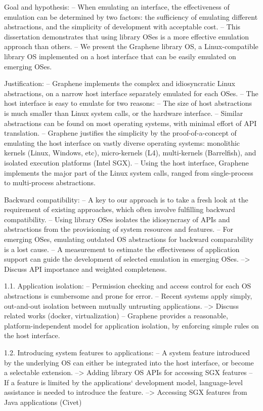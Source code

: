 \begin{outline}  
Goal and hypothesis:
-- When emulating an interface, the effectiveness of emulation can be determined by two factors: the sufficiency of emulating different abstractions, and the simplicity of development with acceptable cost.
-- This dissertation demonstrates that using library OSes is a more effective emulation approach than others.
-- We present the Graphene library OS, a Linux-compatible library OS implemented on a host interface that can be easily emulated on emerging OSes.

Justification:
-- Graphene implements the complex and idiosyncratic Linux abstractions, on a narrow host interface separately emulated for each OSes.
-- The host interface is easy to emulate for two reasons:
  -- The size of host abstractions is much smaller than Linux system calls, or the hardware interface.
  -- Similar abstractions can be found on most operating systems, with minimal effort of API translation.
-- Graphene justifies the simplicity by the proof-of-a-concept of emulating the host interface on vastly diverse operating systems: monolithic kernels (Linux, Windows, etc), micro-kernels (L4), multi-kernels (Barrelfish), and isolated execution platforms (Intel SGX).
-- Using the host interface, Graphene implements the major part of the Linux system calls, ranged from single-process to multi-process abstractions.

Backward compatibility:
-- A key to our approach is to take a fresh look at the requirement of existing approaches, which often involve fulfilling backward compatibility.
-- Using library OSes isolates the idiosyncrasy of APIs and abstractions from the provisioning of system resources and features.
-- For emerging OSes, emulating outdated OS abstractions for backward comparability is a lost cause.
-- A measurement to estimate the effectiveness of application support can guide the development of selected emulation in emerging OSes.
  --> Discuss API importance and weighted completeness.

1.1. Application isolation:
-- Permission checking and access control for each OS abstractions is cumbersome and prone for error.
-- Recent systems apply simply, out-and-out isolation between mutually untrusting applications.
  --> Discuss related works (docker, virtualization)
-- Graphene provides a reasonable, platform-independent model for application isolation, by enforcing simple rules on the host interface.

1.2. Introducing system features to applications:
-- A system feature introduced by the underlying OS can either be integrated into the host interface, or become a selectable extension.
  --> Adding library OS APIs for accessing SGX features
-- If a feature is limited by the applications` development model, language-level assistance is needed to introduce the feature.
  --> Accessing SGX features from Java applications (Civet) 


\end{outline}

